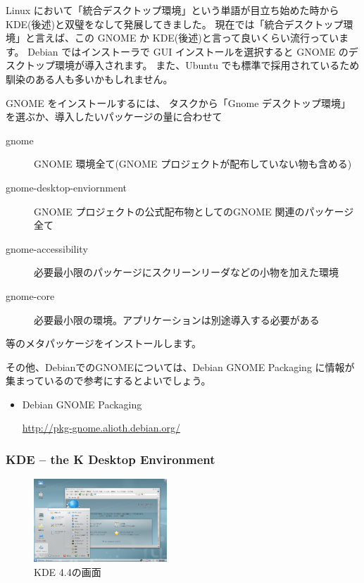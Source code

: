 \documentclass[mingoth,a4paper]{jsarticle}
\begin{document}
Linux において「統合デスクトップ環境」という単語が目立ち始めた時から KDE(後述)と双璧をなして発展してきました。
現在では「統合デスクトップ環境」と言えば、この GNOME か KDE(後述)と言って良いくらい流行っています。
Debian ではインストーラで GUI インストールを選択すると GNOME のデスクトップ環境が導入されます。
また、Ubuntu でも標準で採用されているため馴染のある人も多いかもしれません。

\vspace{1em}

GNOME をインストールするには、
タスクから「Gnome デスクトップ環境」を選ぶか、導入したいパッケージの量に合わせて
\begin{description}
      \item[gnome] 
    GNOME 環境全て(GNOME プロジェクトが配布していない物も含める)
      \item[gnome-desktop-enviornment]
    GNOME プロジェクトの公式配布物としてのGNOME 関連のパッケージ全て
      \item[gnome-accessibility]
    必要最小限のパッケージにスクリーンリーダなどの小物を加えた環境
      \item[gnome-core]
    必要最小限の環境。アプリケーションは別途導入する必要がある
\end{description}
等のメタパッケージをインストールします。

その他、DebianでのGNOMEについては、Debian GNOME Packaging に情報が集まっているので参考にするとよいでしょう。

\begin{itemize}
 \item Debian GNOME Packaging

       \url{http://pkg-gnome.alioth.debian.org/}

\end{itemize}


\subsubsection{KDE -- the K Desktop Environment}
\begin{figure}
 \begin{center}
  \includegraphics[width=5cm]{image201004/kde44.png}
  \caption{KDE 4.4の画面}
 \end{center}
\end{figure}
\end{document}
